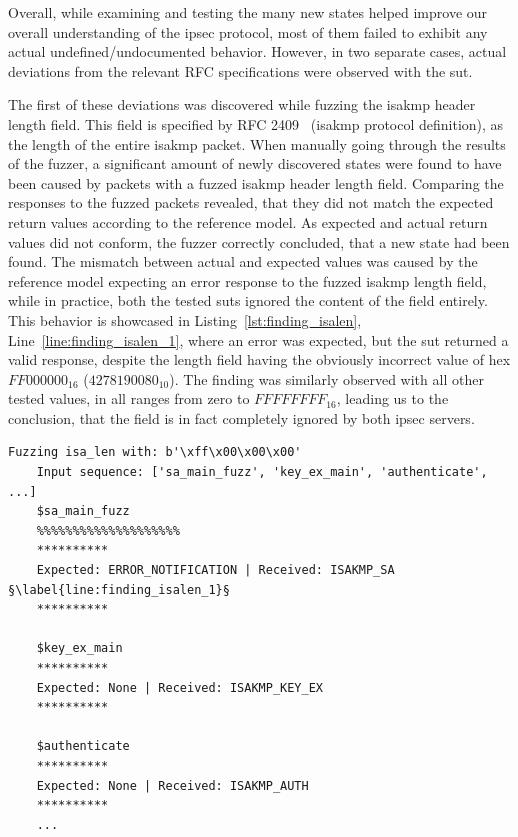 Overall, while examining and testing the many new states helped improve our overall understanding of the \ac{ipsec} protocol, most of them failed to exhibit any actual undefined/undocumented behavior. However, in two separate cases, actual deviations from the relevant RFC specifications were observed with the \ac{sut}. 

The first of these deviations was discovered while fuzzing the \ac{isakmp} header length field. This field is specified by RFC 2409~\cite{rfc:isakmp} (\ac{isakmp} protocol definition), as the length of the entire \ac{isakmp} packet. When manually going through the results of the fuzzer, a significant amount of newly discovered states were found to have been caused by packets with a fuzzed \ac{isakmp} header length field. Comparing the responses to the fuzzed packets revealed, that they did not match the expected return values according to the reference model. As expected and actual return values did not conform, the fuzzer correctly concluded, that a new state had been found. The mismatch between actual and expected values was caused by the reference model expecting an error response to the fuzzed \ac{isakmp} length field, while in practice, both the tested \acp{sut} ignored the content of the field entirely. This behavior is showcased in Listing~\ref{lst:finding_isalen}, Line~\ref{line:finding_isalen_1}, where an error was expected, but the \ac{sut} returned a valid response, despite the length field having the obviously incorrect value of hex $FF000000_{16}$ ($4278190080_{10}$). The finding was similarly observed with all other tested values, in all ranges from zero to $FFFFFFFF_{16}$, leading us to the conclusion, that the field is in fact completely ignored by both \ac{ipsec} servers.

\begin{lstlisting}[float=h, caption=Discovered finding showing the ISAKMP length field being ignored., label=lst:finding_isalen, escapechar=§]
	Fuzzing isa_len with: b'\xff\x00\x00\x00'
	Input sequence: ['sa_main_fuzz', 'key_ex_main', 'authenticate', ...]
	$sa_main_fuzz
	%%%%%%%%%%%%%%%%%%%%
	**********
	Expected: ERROR_NOTIFICATION | Received: ISAKMP_SA §\label{line:finding_isalen_1}§
	**********
	
	$key_ex_main
	**********
	Expected: None | Received: ISAKMP_KEY_EX
	**********
	
	$authenticate
	**********
	Expected: None | Received: ISAKMP_AUTH
	**********
	...
\end{lstlisting}


